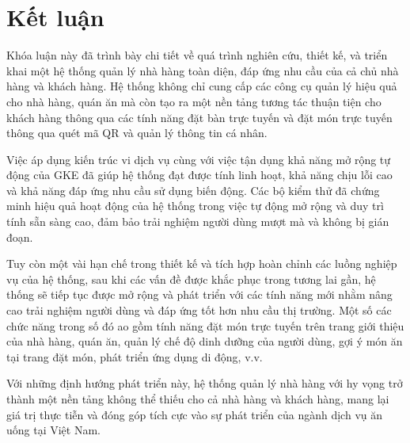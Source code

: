 \chapter*{Kết luận}\label{chap5}
Khóa luận này đã trình bày chi tiết về quá trình nghiên cứu, thiết kế, và triển khai một hệ thống quản lý nhà hàng toàn diện, đáp ứng nhu cầu của cả chủ nhà hàng và khách hàng.
Hệ thống không chỉ cung cấp các công cụ quản lý hiệu quả cho nhà hàng, quán ăn mà còn tạo ra một nền tảng tương tác thuận tiện cho khách hàng thông qua các tính năng đặt bàn trực tuyến và đặt món trực tuyến thông qua quét mã QR và quản lý thông tin cá nhân.

Việc áp dụng kiến trúc vi dịch vụ cùng với việc tận dụng khả năng mở rộng tự động của GKE đã giúp hệ thống đạt được tính linh hoạt, khả năng chịu lỗi cao và khả năng đáp ứng nhu cầu sử dụng biến động. Các bộ kiểm thử đã chứng minh hiệu quả hoạt động của hệ thống trong việc tự động mở rộng và duy trì tính sẵn sàng cao, đảm bảo trải nghiệm người dùng mượt mà và không bị gián đoạn.

Tuy còn một vài hạn chế trong thiết kế và tích hợp hoàn chỉnh các luồng nghiệp vụ của hệ thống, sau khi các vấn đề được khắc phục trong tương lai gần, hệ thống sẽ tiếp tục được mở rộng và phát triển với các tính năng mới nhằm nâng cao trải nghiệm người dùng và đáp ứng tốt hơn nhu cầu thị trường.
Một số các chức năng trong số đó ao gồm tính năng đặt món trực tuyến trên trang giới thiệu của nhà hàng, quán ăn, quản lý chế độ dinh dưỡng của người dùng, gợi ý món ăn tại trang đặt món, phát triển ứng dụng di động, v.v.

Với những định hướng phát triển này, hệ thống quản lý nhà hàng với hy vọng trở thành một nền tảng không thể thiếu cho cả nhà hàng và khách hàng, mang lại giá trị thực tiễn và đóng góp tích cực vào sự phát triển của ngành dịch vụ ăn uống tại Việt Nam.